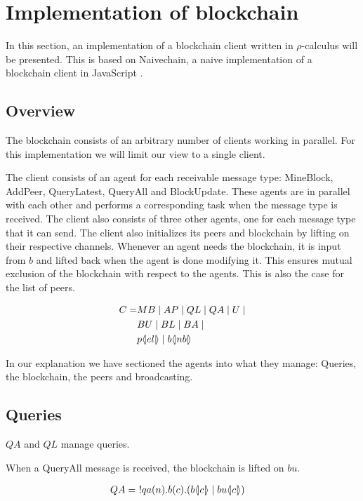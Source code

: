 \section{Implementation of blockchain}
In this section, an implementation of a blockchain client written in $\rho$-calculus will be presented.
This is based on Naivechain, a naive implementation of a blockchain client in JavaScript \cite{naivechain}.

\subsection{Overview}

The blockchain consists of an arbitrary number of clients working in parallel. For this implementation we will limit our view to a single client.

The client consists of an agent for each receivable message type: MineBlock, AddPeer, QueryLatest, QueryAll and BlockUpdate.
These agents are in parallel with each other and performs a corresponding task when the message type is received.
The client also consists of three other agents, one for each message type that it can send.
The client also initializes its peers and blockchain by lifting on their respective channels.
Whenever an agent needs the blockchain, it is input from $b$ and lifted back when the agent is done modifying it.
This ensures mutual exclusion of the blockchain with respect to the agents.
This is also the case for the list of peers.

\begin{align*}
    C =& MB \mid AP \mid QL \mid QA \mid U \mid\\
    & BU \mid BL \mid BA \mid \\
    & p \langle \! | el | \! \rangle \mid b \langle \! | nb | \! \rangle
\end{align*}

In our explanation we have sectioned the agents into what they manage: Queries, the blockchain, the peers and broadcasting.

\subsection{Queries}

$QA$ and $QL$ manage queries.

When a QueryAll message is received, the blockchain is lifted on $bu$.

\begin{align*}
    QA &=\ !qa(n). b(c).(b \langle \! | c | \! \rangle \mid bu \langle \! | c | \! \rangle)
\end{align*}

